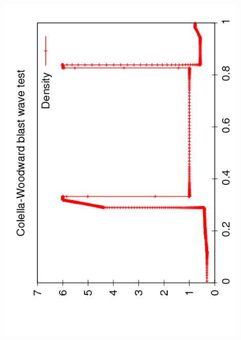 \documentclass{beamer}
\begin{document}
\begin{frame}
\begin{columns}
\begin{column}{0.5\textwidth}
\begin{overlayarea}{\textwidth}{0.9\textheight}
{          \includegraphics[angle=-90,width=0.9\textwidth]{figures/AMR_Density_100}\\
}
\end{overlayarea}
\end{column}
\end{columns}
\end{frame}
\end{document}
